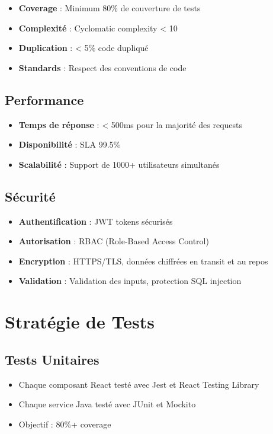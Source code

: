 \documentclass[12pt,a4paper,french]{report}
\begin{document}
\begin{itemize}
    \item \textbf{Coverage} : Minimum 80\% de couverture de tests
    \item \textbf{Complexité} : Cyclomatic complexity < 10
    \item \textbf{Duplication} : < 5\% code dupliqué
    \item \textbf{Standards} : Respect des conventions de code
\end{itemize}

\subsection{Performance}

\begin{itemize}
    \item \textbf{Temps de réponse} : < 500ms pour la majorité des requests
    \item \textbf{Disponibilité} : SLA 99.5\%
    \item \textbf{Scalabilité} : Support de 1000+ utilisateurs simultanés
\end{itemize}

\subsection{Sécurité}

\begin{itemize}
    \item \textbf{Authentification} : JWT tokens sécurisés
    \item \textbf{Autorisation} : RBAC (Role-Based Access Control)
    \item \textbf{Encryption} : HTTPS/TLS, données chiffrées en transit et au repos
    \item \textbf{Validation} : Validation des inputs, protection SQL injection
\end{itemize}

\section{Stratégie de Tests}

\subsection{Tests Unitaires}

\begin{itemize}
    \item Chaque composant React testé avec Jest et React Testing Library
    \item Chaque service Java testé avec JUnit et Mockito
    \item Objectif : 80\%+ coverage
\end{itemize}
\end{document}
